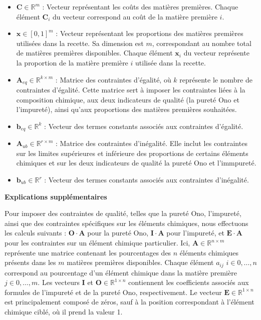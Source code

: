 \documentclass[12pt]{article}
\begin{document}
\begin{itemize}[label=\textbullet]

    \item $\mathbf{C} \in \mathbb{R}^m$ : Vecteur représentant les coûts 
    des matières premières. Chaque élément $\mathbf{C}_i$ du vecteur 
    correspond au coût de la matière première $i$.

    \item $\mathbf{x} \in [0, 1]^m$ : Vecteur représentant les proportions 
    des matières premières utilisées dans la recette. 
    Sa dimension est $m$, correspondant au nombre total de matières 
    premières disponibles. Chaque élément $\mathbf{x}_i$ du vecteur 
    représente la proportion de la matière première $i$ utilisée dans 
    la recette.
    


    \item $\mathbf{A}_{eq} \in \mathbb{R}^{k \times m}$ : Matrice des 
    contraintes d'égalité, où $k$ représente le nombre de contraintes 
    d'égalité. Cette matrice sert à imposer les contraintes liées à 
    la composition chimique, aux deux indicateurs de qualité (la pureté 
    Ono et l'impureté), ainsi qu'aux proportions des matières premières 
    souhaitées.


    \item $\mathbf{b}_{eq} \in \mathbb{R}^k$ : Vecteur des termes constants 
    associés aux contraintes d'égalité.


    \item $\mathbf{A}_{ub} \in \mathbb{R}^{r \times m}$ : Matrice des 
    contraintes d'inégalité. Elle inclut les contraintes sur les limites 
    supérieures et inférieure des proportions de certains éléments chimiques
    et sur les deux indicateurs de qualité la pureté Ono et l'immpureté.
    
    
    \item $\mathbf{b}_{ub} \in \mathbb{R}^r$ : Vecteur des termes constants 
    associés aux contraintes d'inégalité. 


\end{itemize}

\textbf{Explications supplémentaires}


Pour imposer des contraintes de qualité, telles que la pureté Ono, 
l'impureté, ainsi que des contraintes spécifiques sur les éléments 
chimiques, nous effectuons les calculs suivants : 
$\mathbf{O} \cdot \mathbf{A}$ pour la pureté Ono, $\mathbf{I} \cdot \mathbf{A}$ 
pour l'impureté, et $\mathbf{E} \cdot \mathbf{A}$ pour les contraintes sur 
un élément chimique particulier. Ici, $\mathbf{A} \in \mathbb{R}^{n \times m}$ représente une matrice 
contenant les pourcentages des $n$ éléments chimiques présents dans 
les $m$ matières premières disponibles. Chaque élément $a_{ij}$ 
$i \in {0,\dots,n}$ correspond au pourcentage d'un élément chimique dans 
la matière première $j \in {0,\dots,m}$. Les vecteurs $\mathbf{I}$ et 
$\mathbf{O} \in \mathbb{R}^{1 \times n}$ contiennent les coefficients 
associés aux formules de l'impureté et de la pureté Ono, respectivement. 
Le vecteur $\mathbf{E} \in \mathbb{R}^{1 \times n}$ est principalement 
composé de zéros, sauf à la position correspondant à l'élément chimique 
ciblé, où il prend la valeur 1.
\end{document}
